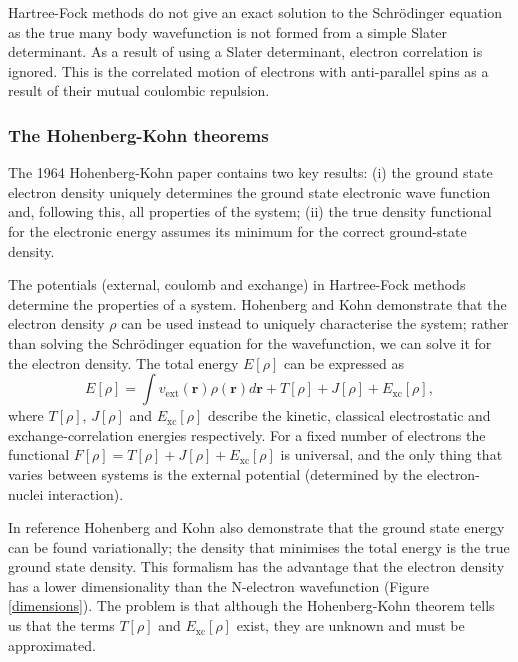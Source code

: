 Hartree-Fock methods do not give an exact solution to the Schr\"{o}dinger equation as the true many body wavefunction is not formed from a simple Slater determinant. As a result of using a Slater determinant, electron correlation is ignored. This is the correlated motion of electrons with anti-parallel spins as a result of their mutual coulombic repulsion.

\subsubsection{The Hohenberg-Kohn theorems}

The 1964 Hohenberg-Kohn paper\autocite{Hohenberg1964} contains two key results: (i) the ground state electron density uniquely determines the ground state electronic wave function and, following this, all properties of the system; (ii) the true density functional for the electronic energy assumes its minimum for the correct ground-state density. %

The potentials (external, coulomb and exchange) in Hartree-Fock methods determine the properties of a system. Hohenberg and Kohn demonstrate that the electron density $\rho$ can be used instead to uniquely characterise the system; rather than solving the Schr\"{o}dinger equation for the wavefunction, we can solve it for the electron density. The total energy $E\left[\rho\right]$ can be expressed as
\begin{equation}
 E\left[\rho\right]=\int v_{\textrm{ext}}(\textbf{r})\rho(\textbf{r})d\textbf{r}+T\left[\rho\right]+J\left[\rho\right]+E_{\textrm{xc}}\left[\rho\right],   
\end{equation}
where $T\left[\rho\right]$, $J\left[\rho\right]$ and $E_\textrm{xc}\left[\rho\right]$ describe the kinetic, classical electrostatic and exchange-correlation energies respectively. 
For a fixed number of electrons the functional $F\left[\rho\right]=T\left[\rho\right]+J\left[\rho\right]+E_{\textrm{xc}}\left[\rho\right]$ is universal, and the only thing that varies between systems is the external potential (determined by the electron-nuclei interaction). 

In reference \cite{Hohenberg1964} Hohenberg and Kohn also demonstrate that the ground state energy can be found variationally; the density that minimises the total energy is the true ground state density. This formalism has the advantage that the electron density has a lower dimensionality than the N-electron wavefunction (Figure \ref{dimensions}). The problem is that although the Hohenberg-Kohn theorem tells us that the terms $T\left[\rho\right]$ and $E_{\textrm{xc}}\left[\rho\right]$ exist, they are unknown and must be approximated.

